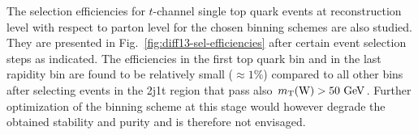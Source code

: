 
The selection efficiencies for $t$-channel single top quark events at reconstruction level with respect to parton level for the chosen binning schemes are also studied. They are presented in Fig.~\ref{fig:diff13-sel-efficiencies} after certain event selection steps as indicated. The efficiencies in the first top quark \pt bin and in the last rapidity bin are found to be relatively small ($\approx 1\%$)  compared to all other bins after selecting events in the 2j1t region that pass also $m_{\textrm{T}}(\textrm{W})>50~\textrm{GeV}$. Further optimization of the binning scheme at this stage would however degrade the obtained stability and purity and is therefore not envisaged.

